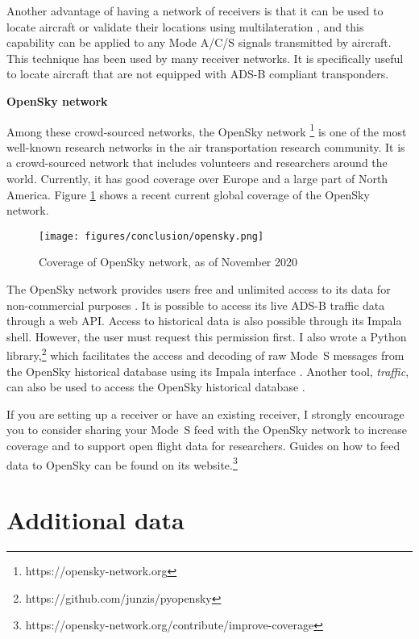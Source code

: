 Another advantage of having a network of receivers is that it can be used to locate aircraft or validate their locations using multilateration \cite{kaune2012}, and this capability can be applied to any Mode A/C/S signals transmitted by aircraft. This technique has been used by many receiver networks. It is specifically useful to locate aircraft that are not equipped with ADS-B compliant transponders.

{\large\textbf{OpenSky network}}

Among these crowd-sourced networks, the OpenSky network \footnote{https://opensky-network.org} is one of the most well-known research networks in the air transportation research community. It is a crowd-sourced network that includes volunteers and researchers around the world. Currently, it has good coverage over Europe and a large part of North America. Figure \ref{fig:opensky_coverage} shows a recent current global coverage of the OpenSky network.

\begin{figure}[ht]
    \centering
    \texttt{[image: figures/conclusion/opensky.png]}
    \caption{Coverage of OpenSky network, as of November 2020}
    \label{fig:opensky_coverage}
\end{figure}

The OpenSky network provides users free and unlimited access to its data for non-commercial purposes \cite{schafer2014opensky}. It is possible to access its live ADS-B traffic data through a web API. Access to historical data is also possible through its Impala shell. However, the user must request this permission first. I also wrote a Python library,\footnote{https://github.com/junzis/pyopensky} which facilitates the access and decoding of raw Mode~S messages from the OpenSky historical database using its Impala interface \cite{sun2019pyopensky}. Another tool, \emph{traffic}, can also be used to access the OpenSky historical database \cite{olive2019}.

If you are setting up a receiver or have an existing receiver, I strongly encourage you to consider sharing your Mode~S feed with the OpenSky network to increase coverage and to support open flight data for researchers. Guides on how to feed data to OpenSky can be found on its website.\footnote{https://opensky-network.org/contribute/improve-coverage}

\section{Additional data}

